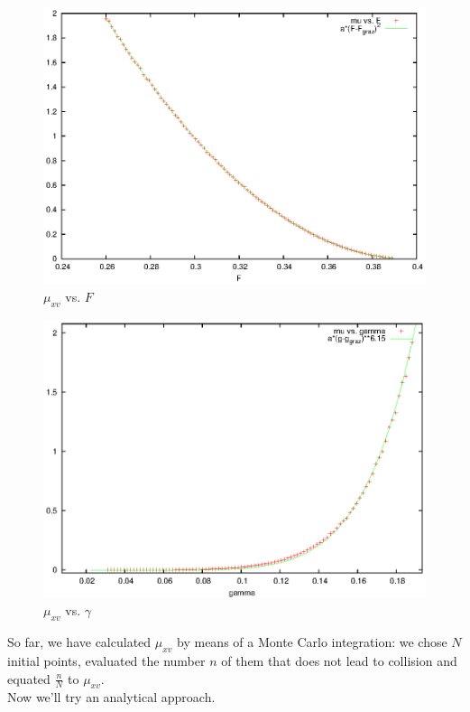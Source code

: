 \documentclass[oneside]{book}
\renewcommand{\(}{\begin{columns}}
\renewcommand{\)}{\end{columns}}
\newcommand{\<}[1]{\begin{column}{#1}}
\renewcommand{\>}{\end{column}}
\begin{document}
\begin{figure}
\begin{center}
\caption{$\mu_{xv}$ vs.  $F$}
\label{fig-scanf}
\includegraphics[width=0.8\columnwidth]{scanf}
\end{center}
\end{figure}



\begin{figure}
\begin{center}
\caption{$\mu_{xv}$ vs.  $\gamma$}
\label{fig-scang}
\includegraphics[width=0.8\columnwidth]{scang}
\end{center}
\end{figure}



So far, we have calculated $\mu_{xv}$ by means of a Monte Carlo integration: 
we chose $N$ initial points, evaluated the number $n$ of them that does 
not lead to collision and equated $\frac{n}{N}$ to $\mu_{xv}$.  \\

Now we'll try an analytical approach.  
\end{document}
